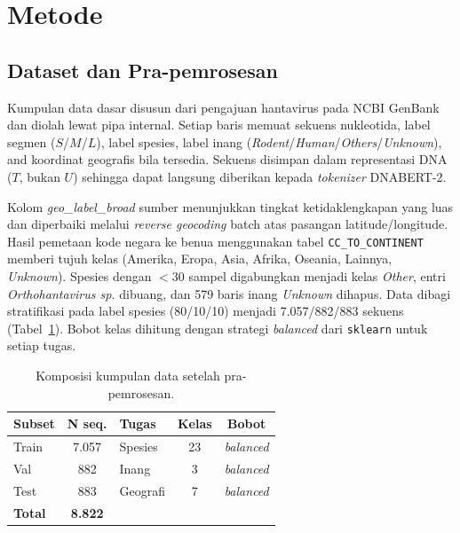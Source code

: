 \documentclass[conference]{IEEEtran}
\begin{document}
\section{Metode}\label{sec:method}

\subsection{Dataset dan Pra-pemrosesan}

Kumpulan data dasar disusun dari pengajuan hantavirus pada NCBI GenBank
dan diolah lewat pipa internal. Setiap baris memuat sekuens nukleotida,
label segmen ($S$/$M$/$L$), label spesies, label inang
(\emph{Rodent}/\emph{Human}/\emph{Others}/\emph{Unknown}), and koordinat
geografis bila tersedia. Sekuens disimpan dalam representasi DNA
($T$, bukan $U$) sehingga dapat langsung diberikan kepada \emph{tokenizer}
DNABERT-2.

Kolom \emph{geo\_label\_broad} sumber menunjukkan tingkat ketidaklengkapan yang luas dan
diperbaiki melalui \emph{reverse geocoding} batch atas pasangan
latitude/longitude. Hasil pemetaan kode negara ke benua menggunakan tabel
\texttt{CC\_TO\_CONTINENT} memberi tujuh kelas (Amerika, Eropa, Asia,
Afrika, Oseania, Lainnya, \emph{Unknown}). Spesies dengan $<\!30$ sampel
digabungkan menjadi kelas \emph{Other}, entri \emph{Orthohantavirus sp.}
dibuang, dan 579 baris inang \emph{Unknown} dihapus. Data dibagi
stratifikasi pada label spesies (80/10/10) menjadi 7.057/882/883
sekuens (Tabel~\ref{tab:dataset}). Bobot kelas dihitung dengan strategi
\emph{balanced} dari \texttt{sklearn} untuk setiap tugas.

\begin{table}[t]
\centering
\caption{Komposisi kumpulan data setelah pra-pemrosesan.}
\label{tab:dataset}
\begin{tabular}{lc|lcc}
\toprule
\textbf{Subset} & \textbf{N seq.} &
\textbf{Tugas} & \textbf{Kelas} & \textbf{Bobot} \\
\midrule
Train & 7.057 & Spesies  & 23 & \emph{balanced} \\
Val   & 882   & Inang    & 3  & \emph{balanced} \\
Test  & 883   & Geografi & 7  & \emph{balanced} \\
\midrule
\textbf{Total} & \textbf{8.822} & & & \\
\bottomrule
\end{tabular}
\end{table}
\end{document}
